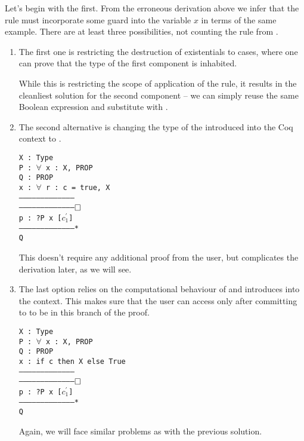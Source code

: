 {Let's begin with the first.
From the erroneous derivation above we infer that the rule must incorporate some guard into the variable \(x\) in terms of the same example.
There are at least three possibilities, not counting the rule from \citet{harlandResourceDistributionBooleanConstraints2003}.
\begin{enumerate}
\item
  The first one is restricting the destruction of existentials to cases, where one can prove that the type of the first component is inhabited.

  While this is restricting the scope of application of the rule, it results in the cleanliest solution for the second component -- we can simply reuse the same Boolean expression and substitute  with .
\item The second alternative is changing the type of the  introduced into the Coq context to .

\begin{minipage}{\linewidth}
\texttt{X : Type\\
P : $\forall$ x : X, PROP\\
Q : PROP\\
x : $\forall$ r : c = true, X\\
---------------------------------------\\
---------------------------------------$\mathop{\Box}$\\
p : ?P x [$c^{'}_1$]\\
---------------------------------------*\\
Q
}
\end{minipage}
  This doesn't require any additional proof from the user, but complicates the derivation later, as we will see.
\item The last option relies on the computational behaviour of  and introduces  into the context.
  This makes sure that the user can access  only after committing to  to be \true in this branch of the proof.

\begin{minipage}{\linewidth}
\texttt{X : Type\\
P : $\forall$ x : X, PROP\\
Q : PROP\\
x : if c then X else True\\
---------------------------------------\\
---------------------------------------$\mathop{\Box}$\\
p : ?P x [$c^{'}_1$]\\
---------------------------------------*\\
Q
}
\end{minipage}
Again, we will face similar problems as with the previous solution.
\end{enumerate}

}
